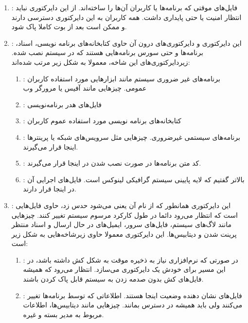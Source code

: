 \begin{enumerate}
\item {\large{}}:
فایل‌های موقتی که برنامه‌ها یا کاربران آن‌ها را ساخته‌اند. از این دایرکتوری نباید انتظار امنیت یا حتی پایداری داشت. همه کاربران به این دایرکتوری دسترسی دارند و ممکن است بعد از بوت کاملا پاک شود.
\item {\large{}}:
این دایرکتوری و دایرکتوری‌های درون آن حاوی کتابخانه‌های برنامه نویسی، اسناد، برنامه‌ها و حتی سورس برنامه‌هایی هستند که در سیستم نصب شده. زیردایرکتوری‌های این شاخه، معمولا به شکل زیر مرتب شده‌اند:
\begin{enumerate}
\item {\large{}}:
برنامه‌های غیر ضروری سیستم مانند ابزارهایی مورد استفاده کاربران عمومی. چیزهایی مانند آفیس یا مرورگر وب
\item {\large{}}:
فایل‌های هدر برنامه‌نویسی
\item {\large{}}:
کتابخانه‌های برنامه نویسی مورد استفاده عموم کاربران
\item {\large{}}:
برنامه‌های سیستمی غیرضروری. چیزهایی مثل سرویس‌های شبکه یا پرینترها اینجا قرار می‌گیرند.
\item {\large{}}:
کد متن برنامه‌ها در صورت نصب شدن در اینجا قرار می‌گیرند.
\item {\large{}}:
بالاتر گفتیم که 
 لایه پایینی سیستم گرافیکی لینوکس است. فایل‌های اجرایی آن در اینجا قرار دارند.
\end{enumerate}
\item {\large{}}:
این دایرکتوری همانطور که از نام آن یعنی 
 می‌شود حدس زد، حاوی فایل‌هایی است که انتظار می‌رود دائما در طول کارکرد مرسوم سیستم تغییر کنند. چیزهایی مانند لاگ‌های سیستم، فایل‌های سرور، ایمیل‌های در حال ارسال و اسناد منتظر پرینت شدن و دیتابیس‌ها. این دایرکتوری معمولا حاوی زیرشاخه‌هایی به شکل زیر است:
\begin{enumerate}
\item {\large{}}:
در صورتی که نرم‌افزاری نیاز به ذخیره موقت به شکل کش داشته باشد، در این مسیر برای خودش یک دایرکتوری می‌سازد. انتظار می‌رود که همیشه فایل‌های کش بدون صدمه زدن به سیستم قابل پاک کردن باشند.
\item {\large{}}:
فایل‌های نشان دهنده وضعیت اینجا هستند. اطلاعاتی که توسط برنامه‌ها تغییر می‌کنند ولی باید همیشه در دسترس بمانند. چیزهایی مانند دیتابیس‌ها، اطلاعات مربوط به مدیر بسته و غیره.

\end{enumerate}
\end{enumerate}
